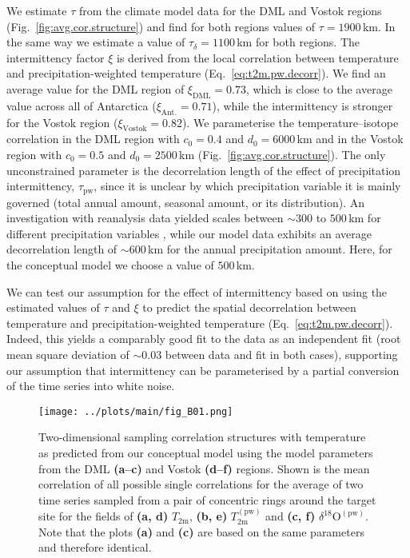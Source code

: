 \documentclass[cp, manuscript]{copernicus}
\begin{document}
We estimate $\tau$ from the climate model data for the DML and Vostok regions
(Fig.~\ref{fig:avg.cor.structure}) and find for both regions values of
$\tau=1900$\,km. In the same way we estimate a value of $\tau_{\delta}=1100$\,km
for both regions. The intermittency factor $\xi$ is derived from the local
correlation between temperature and precipitation-weighted temperature
(Eq.~\ref{eq:t2m.pw.decorr}). We find an average value for the DML region
of $\xi_{\mathrm{DML}}=0.73$, which is close to the average value across all of
Antarctica ($\xi_{\mathrm{Ant.}}=0.71$), while the intermittency is stronger for
the Vostok region ($\xi_{\mathrm{Vostok}}=0.82$). We parameterise the
temperature--isotope correlation in the DML region with $c_0=0.4$ and
$d_0=6000$\,km and in the Vostok region with $c_0=0.5$ and $d_0=2500$\,km
(Fig.~\ref{fig:avg.cor.structure}). The only unconstrained parameter is the
decorrelation length of the effect of precipitation intermittency,
$\tau_{\mathrm{pw}}$, since it is unclear by which precipitation variable it is
mainly governed (total annual amount, seasonal amount, or its distribution). An
investigation with reanalysis data yielded scales between $\sim300$ to $500$\,km
for different precipitation variables \citep{Munch2018a}, while our model data
exhibits an average decorrelation length of $\sim600$\,km for the annual
precipitation amount. Here, for the conceptual model we choose a value of
$500$\,km.

We can test our assumption for the effect of intermittency based on using the
estimated values of $\tau$ and $\xi$ to predict the spatial decorrelation
between temperature and precipitation-weighted temperature
(Eq.~\ref{eq:t2m.pw.decorr}). Indeed, this yields a comparably good fit to
the data as an independent fit (root mean square deviation of $\sim0.03$ between
data and fit in both cases), supporting our assumption that intermittency can be
parameterised by a partial conversion of the time series into white noise.

\begin{figure*}[t]%
\centering
\texttt{[image: ../plots/main/fig\_B01.png]}
\caption{%
  Two-dimensional sampling correlation structures with temperature as predicted
  from our conceptual model using the model parameters from the DML
  \textbf{(a--c)} and Vostok \textbf{(d--f)} regions. Shown is the mean
  correlation of all possible single correlations for the average of two time
  series sampled from a pair of concentric rings around the target site for the
  fields of \textbf{(a, d)} $T_{\mathrm{2m}}$, \textbf{(b, e)}
  $T_{\mathrm{2m}}^{\mathrm{(pw)}}$ and \textbf{(c, f)}
  $\delta^{18}\mathrm{O}^{\mathrm{(pw)}}$. Note that the plots \textbf{(a)} and
  \textbf{(c)} are based on the same parameters and therefore identical.}
\label{fig:conceptual.model}%
\end{figure*}%
\end{document}
